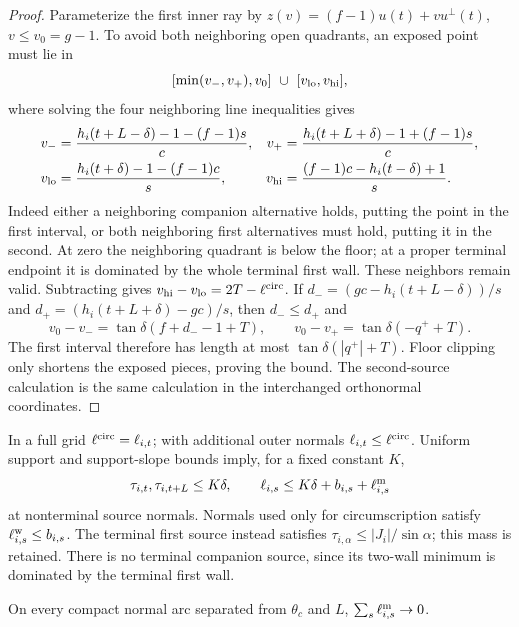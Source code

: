 \begin{proof}
Parameterize the first inner ray by
$z(v)=(f-1)u(t)+v u^\perp(t)$, $v\le v_0=g-1$.
To avoid both neighboring open quadrants, an exposed point must lie in
\[
 [\min(v_-,v_+),v_0]\ \cup\ [v_{\rm lo},v_{\rm hi}],
\]
where solving the four neighboring line inequalities gives
\[
 \begin{aligned}
 v_-&=\frac{h_i(t+L-\delta)-1-(f-1)s}{c},&
 v_+&=\frac{h_i(t+L+\delta)-1+(f-1)s}{c},\\
 v_{\rm lo}&=\frac{h_i(t+\delta)-1-(f-1)c}{s},&
 v_{\rm hi}&=\frac{(f-1)c-h_i(t-\delta)+1}{s}.
 \end{aligned}
\]
Indeed either a neighboring companion alternative holds, putting
the point in the first interval, or both neighboring first alternatives
must hold, putting it in the second. At zero the neighboring quadrant
is below the floor; at a proper terminal endpoint it is dominated
by the whole terminal first wall. These neighbors remain valid.
Subtracting gives $v_{\rm hi}-v_{\rm lo}=2T-\ell^{\rm circ}$.
If $d_-=(gc-h_i(t+L-\delta))/s$ and
$d_+=(h_i(t+L+\delta)-gc)/s$, then $d_-\le d_+$ and
\[
 v_0-v_-=\tan\delta(f+d_--1+T),\qquad
 v_0-v_+=\tan\delta(-q^++T).
\]
The first interval therefore has length at most
$\tan\delta(|q^+|+T)$. Floor clipping only shortens the exposed
pieces, proving the bound. The second-source calculation is the
same calculation in the interchanged orthonormal coordinates.
\end{proof}

In a full grid $\ell^{\rm circ}=\ell_{i,t}$; with additional
outer normals $\ell_{i,t}\le\ell^{\rm circ}$. Uniform support
and support-slope bounds imply, for a fixed constant $K$,
\begin{equation}\label{eq:variation-coarse}
 \tau_{i,t},\tau_{i,t+L}\le K\delta,
 \qquad
 \ell_{i,s}\le K\delta+b_{i,s}+\ell^{\rm m}_{i,s}
\end{equation}
at nonterminal source normals. Normals used only for circumscription
satisfy $\ell^{\rm w}_{i,s}\le b_{i,s}$.
The terminal first source instead satisfies
$\tau_{i,\alpha}\le |J_i|/\sin\alpha$; this mass is retained.
There is no terminal companion source, since its two-wall minimum
is dominated by the terminal first wall.

\begin{lemma}\label{lem:variation-middle}
On every compact normal arc separated from $\theta_c$ and $L$,
$\sum_s\ell^{\rm m}_{i,s}\to0$.
\end{lemma}

